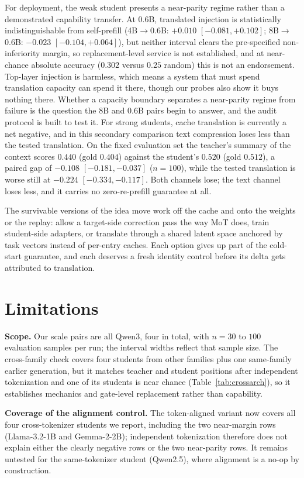 \documentclass{article} %
\begin{document}
For deployment, the weak student presents a near-parity regime rather than a
demonstrated capability transfer. At 0.6B, translated injection is
statistically indistinguishable from self-prefill
(4B$\to$0.6B: $+0.010$ $[-0.081,+0.102]$; 8B$\to$0.6B: $-0.023$
$[-0.104,+0.064]$), but neither interval clears the pre-specified
non-inferiority margin, so replacement-level service is not established, and
at near-chance absolute accuracy ($0.302$ versus $0.25$ random) this is not an
endorsement. Top-layer injection is harmless, which means a system that
must spend translation capacity can spend it there, though our probes also
show it buys nothing there. Whether a capacity boundary separates a
near-parity regime from failure is the question the 8B
and 0.6B pairs begin to answer, and the audit protocol is built to test it.
For strong students, cache translation is currently a net negative, and in this
secondary comparison text compression loses less than the tested translation.
On the fixed evaluation set the teacher's summary of the context scores $0.440$
(gold $0.404$) against the student's $0.520$ (gold $0.512$), a paired gap of
$-0.108$ $[-0.181, -0.037]$ ($n{=}100$), while the tested translation is worse
still at $-0.224$ $[-0.334, -0.117]$. Both channels lose; the text channel loses
less, and it carries no zero-re-prefill guarantee at all.

The survivable versions of the idea move work off the cache and onto the
weights or the replay: allow a target-side correction pass the way MoT does,
train student-side adapters, or translate through a shared latent space
anchored by task vectors instead of per-entry caches. Each option gives up
part of the cold-start guarantee, and each deserves a fresh identity control
before its delta gets attributed to translation.

\section{Limitations}
\label{sec:limitations}
\textbf{Scope.} Our scale pairs are all Qwen3, four in total, with $n{=}30$ to
$100$ evaluation samples per run; the interval widths reflect that sample size.
The cross-family check covers four students from other families plus one
same-family earlier generation, but it matches teacher and student positions
after independent tokenization and one of its students is near chance
(Table~\ref{tab:crossarch}), so it establishes mechanics and gate-level
replacement rather than capability.

\textbf{Coverage of the alignment control.} The token-aligned variant now covers
all four cross-tokenizer students we report, including the two near-margin rows
(Llama-3.2-1B and Gemma-2-2B); independent tokenization therefore does not
explain either the clearly negative rows or the two near-parity rows. It remains
untested for the same-tokenizer student (Qwen2.5), where alignment is a no-op by
construction.
\end{document}
